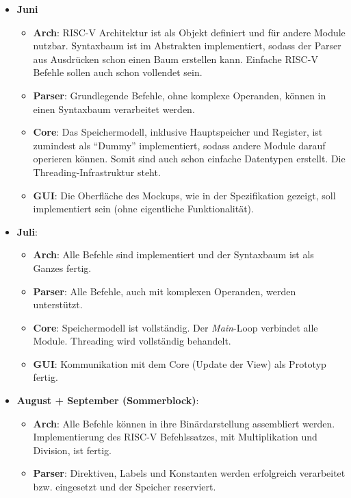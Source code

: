 \begin{itemize}
  \item \textbf{Juni}
     \begin{itemize}
     \item \textbf{Arch}: RISC-V Architektur ist als Objekt definiert und für
       andere Module nutzbar. Syntaxbaum ist im Abstrakten implementiert, sodass
       der Parser aus Ausdrücken schon einen Baum erstellen kann. Einfache
       RISC-V Befehle sollen auch schon vollendet sein.
     \item \textbf{Parser}: Grundlegende Befehle, ohne komplexe Operanden,
       können in einen Syntaxbaum verarbeitet werden.
     \item \textbf{Core}: Das Speichermodell, inklusive Hauptspeicher und
       Register, ist zumindest als ``Dummy'' implementiert, sodass andere Module
       darauf operieren können. Somit sind auch schon einfache Datentypen
       erstellt. Die Threading-Infrastruktur steht.
     \item \textbf{GUI}: Die Oberfläche des Mockups, wie in der Spezifikation
       gezeigt, soll implementiert sein (ohne eigentliche Funktionalität).
     \end{itemize}
  \item \textbf{Juli}:
    \begin{itemize}
      \item \textbf{Arch}: Alle Befehle sind implementiert und der Syntaxbaum
        ist als Ganzes fertig.
      \item \textbf{Parser}: Alle Befehle, auch mit komplexen Operanden, werden unterstützt.
      \item \textbf{Core}: Speichermodell ist vollständig. Der \emph{Main}-Loop
        verbindet alle Module. Threading wird vollständig behandelt.
      \item \textbf{GUI}: Kommunikation mit dem Core (Update der View) als
        Prototyp fertig.
    \end{itemize}
  \item \textbf{August + September (Sommerblock)}:
    \begin{itemize}
      \item \textbf{Arch}: Alle Befehle können in ihre Binärdarstellung
        assembliert werden. Implementierung des RISC-V Befehlssatzes, mit
        Multiplikation und Division, ist fertig.
      \item \textbf{Parser}: Direktiven, Labels und Konstanten werden
        erfolgreich verarbeitet bzw. eingesetzt und der Speicher reserviert.

\end{itemize}
\end{itemize}
